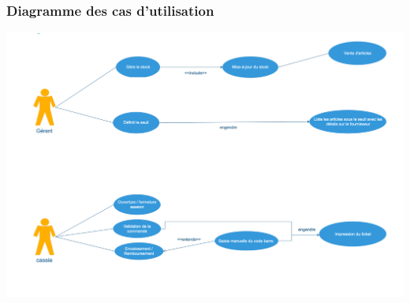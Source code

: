 \documentclass[french,10pt,a4paper]{report}
\begin{document}
\subsubsection{Diagramme des cas d’utilisation}
\begin{center}
 \includegraphics[scale=1]{captures/g_it1_2.png}
\end{center}
\end{document}
